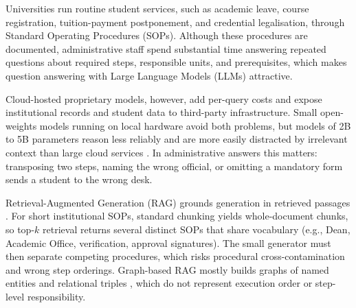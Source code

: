 \documentclass[preprint,10pt]{elsarticle}
\begin{document}
Universities run routine student services, such as academic leave, course registration, tuition-payment postponement, and credential legalisation, through Standard Operating Procedures (SOPs). Although these procedures are documented, administrative staff spend substantial time answering repeated questions about required steps, responsible units, and prerequisites, which makes question answering with Large Language Models (LLMs) attractive.

Cloud-hosted proprietary models, however, add per-query costs and expose institutional records and student data to third-party infrastructure. Small open-weights models running on local hardware avoid both problems, but models of 2B to 5B parameters reason less reliably and are more easily distracted by irrelevant context than large cloud services \cite{liu2024lost}. In administrative answers this matters: transposing two steps, naming the wrong official, or omitting a mandatory form sends a student to the wrong desk.

Retrieval-Augmented Generation (RAG) grounds generation in retrieved passages \cite{lewis2020rag,gao2023ragsurvey}. For short institutional SOPs, standard chunking yields whole-document chunks, so top-$k$ retrieval returns several distinct SOPs that share vocabulary (e.g., Dean, Academic Office, verification, approval signatures). The small generator must then separate competing procedures, which risks procedural cross-contamination and wrong step orderings. Graph-based RAG \cite{peng2024graphragsurvey,pan2024unifying} mostly builds graphs of named entities and relational triples \cite{edge2024graphrag,guo2024lightrag,gutierrez2024hipporag}, which do not represent execution order or step-level responsibility.
\end{document}
